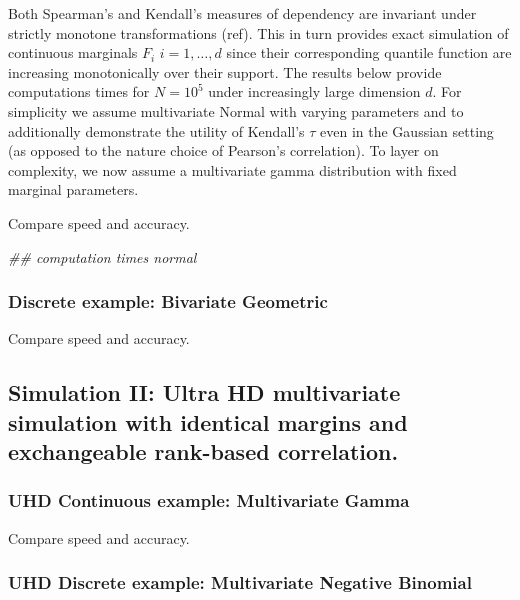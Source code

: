 \documentclass[
]{article}
\newenvironment{Shaded}{\begin{snugshade}}{\end{snugshade}}
\newcommand{\CommentTok}[1]{\textcolor[rgb]{0.56,0.35,0.01}{\textit{#1}}}
\begin{document}
Both Spearman's and Kendall's measures of dependency are invariant under
strictly monotone transformations (ref). This in turn provides exact simulation
of continuous marginals \(F_i\) \(i=1,\ldots,d\) since their corresponding quantile
function are increasing monotonically over their support. The results below
provide computations times for \(N=10^5\) under increasingly large dimension \(d\).
For simplicity we assume multivariate Normal with varying parameters and to
additionally demonstrate the utility of Kendall's \(\tau\) even in the Gaussian
setting (as opposed to the nature choice of Pearson's correlation). To layer on complexity, we now assume a multivariate gamma distribution with fixed marginal parameters.

Compare speed and accuracy.

\begin{Shaded}
\begin{Highlighting}[]
\CommentTok{\#\# computation times normal}
\end{Highlighting}
\end{Shaded}

\hypertarget{discrete-example-bivariate-geometric}{%
\subsubsection{Discrete example: Bivariate Geometric}\label{discrete-example-bivariate-geometric}}

Compare speed and accuracy.

\hypertarget{simulation-ii-ultra-hd-multivariate-simulation-with-identical-margins-and-exchangeable-rank-based-correlation.}{%
\subsection{Simulation II: Ultra HD multivariate simulation with identical margins and exchangeable rank-based correlation.}\label{simulation-ii-ultra-hd-multivariate-simulation-with-identical-margins-and-exchangeable-rank-based-correlation.}}

\hypertarget{uhd-continuous-example-multivariate-gamma}{%
\subsubsection{UHD Continuous example: Multivariate Gamma}\label{uhd-continuous-example-multivariate-gamma}}

Compare speed and accuracy.

\hypertarget{uhd-discrete-example-multivariate-negative-binomial}{%
\subsubsection{UHD Discrete example: Multivariate Negative Binomial}\label{uhd-discrete-example-multivariate-negative-binomial}}
\end{document}
